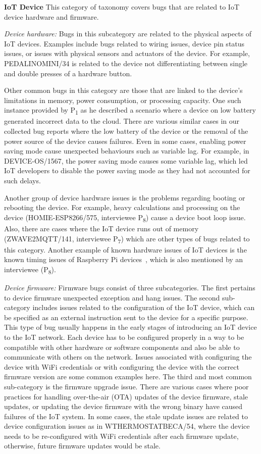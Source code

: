 \textbf{IoT Device}
This category of taxonomy covers bugs that are related to IoT device hardware and firmware.

\textit{Device hardware:}
Bugs in this subcategory are related to the physical aspects of IoT devices.  Examples include bugs related to wiring issues, device pin status issues, or issues with physical sensors and actuators of the device. For example, PEDALINOMINI/34 is related to the device not differentiating between single and double presses of a hardware button. 
 
 Other common bugs in this category are those that are linked to the device's limitations in memory, power consumption, or processing capacity. One such instance provided by P\textsubscript{1} as he described a scenario where a device on low battery generated incorrect data to the cloud. There are various similar cases in our collected bug reports where the low battery of the device or the removal of the power source of the device causes failures. Even in some cases, enabling power saving mode cause unexpected behaviours such as variable lag. For example, in DEVICE-OS/1567, the power saving mode causes some variable lag, which led IoT developers to disable the power saving mode as they had not accounted for such delays.
 
 Another group of device hardware issues is the problems regarding booting or rebooting the device. For example, heavy calculations and processing on the device (HOMIE-ESP8266/575, interviewee P\textsubscript{8}) cause a device boot loop issue. Also, there are cases where the IoT device runs out of memory (ZWAVE2MQTT/141, interviewee P\textsubscript{7}) which are other types of bugs related to this category. Another example of known hardware issues of IoT devices is the known timing issues of Raspberry Pi devices~\cite{piClockissues},  which is also mentioned by an interviewee (P\textsubscript{8}).

\textit{Device firmware:} 
Firmware bugs consist of three subcategories. The first pertains to device firmware unexpected exception and hang issues. The second sub-category includes issues related to the configuration of the IoT device, which can be specified as an external instruction sent to the device for a specific purpose. This type of bug usually happens in the early stages of introducing an IoT device to the IoT network. Each device has to be configured properly in a way to be compatible with other hardware or software components and also be able to communicate with others on the network. Issues associated with configuring the device with WiFi credentials or with configuring the device with the correct firmware version are some common examples here. The third and most common sub-category is the firmware upgrade issue. There are various cases where poor practices for handling over-the-air (OTA) updates of the device firmware, stale updates, or updating the device firmware with the wrong binary have caused failures of the IoT system.
In some cases, the stale update issues are related to device configuration issues as in WTHERMOSTATBECA/54, where the device needs to be re-configured with WiFi credentials after each firmware update, otherwise, future firmware updates would be stale. 

